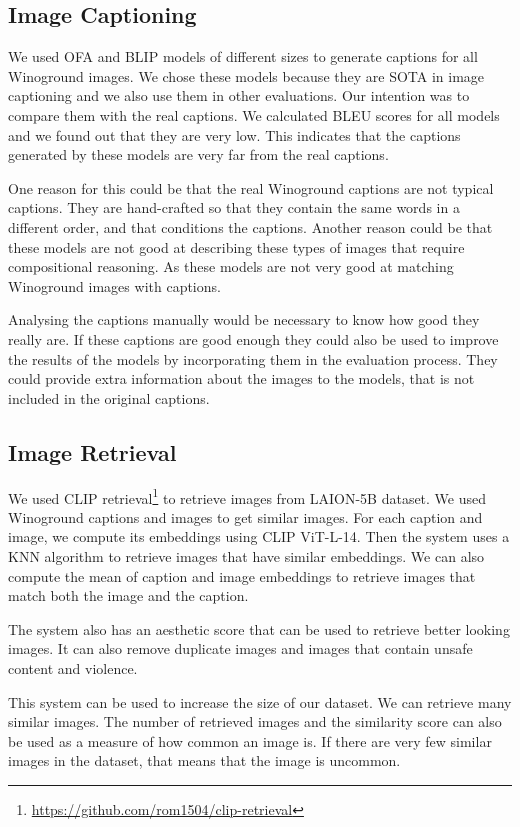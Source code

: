 \subsection{Image Captioning} \label{image_captioning}

We used OFA \cite{wang2022unifying} and BLIP \cite{li2022blip} models of different sizes to generate captions for all Winoground images. We chose these models because they are SOTA in image captioning and we also use them in other evaluations. Our intention was to compare them with the real captions. We calculated BLEU scores for all models and we found out that they are very low. This indicates that the captions generated by these models are very far from the real captions. 

One reason for this could be that the real Winoground captions are not typical captions. They are hand-crafted so that they contain the same words in a different order, and that conditions the captions. Another reason could be that these models are not good at describing these types of images that require compositional reasoning. As these models are not very good at matching Winoground images with captions.

Analysing the captions manually would be necessary to know how good they really are. If these captions are good enough they could also be used to improve the results of the models by incorporating them in the evaluation process. They could provide extra information about the images to the models, that is not included in the original captions.

\subsection{Image Retrieval} \label{image_retrieval}

We used CLIP retrieval\footnote{\url{https://github.com/rom1504/clip-retrieval}} to retrieve images from LAION-5B dataset. We used Winoground captions and images to get similar images. For each caption and image, we compute its embeddings using CLIP ViT-L-14. Then the system uses a KNN algorithm to retrieve images that have similar embeddings. We can also compute the mean of caption and image embeddings to retrieve images that match both the image and the caption.

The system also has an aesthetic score that can be used to retrieve better looking images. It can also remove duplicate images and images that contain unsafe content and violence.

This system can be used to increase the size of our dataset. We can retrieve many similar images. The number of retrieved images and the similarity score can also be used as a measure of how common an image is. If there are very few similar images in the dataset, that means that the image is uncommon.